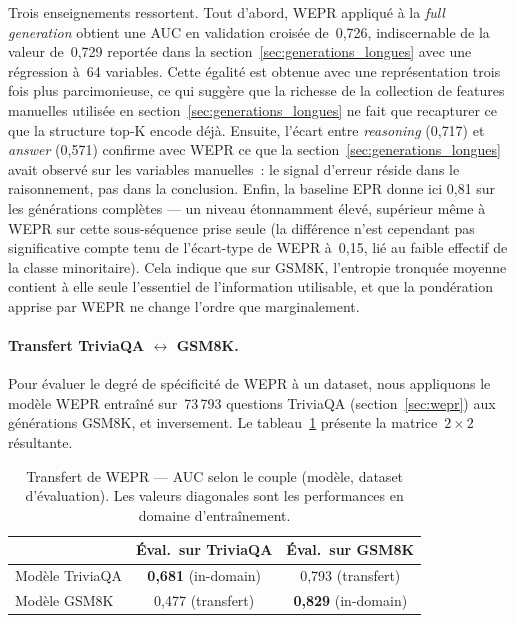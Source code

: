 Trois enseignements ressortent. Tout d'abord, WEPR appliqué à la
\emph{full generation} obtient une AUC en validation croisée de~0{,}726,
indiscernable de la valeur de~0{,}729 reportée dans la
section~\ref{sec:generations_longues} avec une régression à~64 variables. Cette
égalité est obtenue avec une représentation trois fois plus
parcimonieuse, ce qui suggère que la richesse de la collection de
features manuelles utilisée en section~\ref{sec:generations_longues}
ne fait que recapturer ce que la structure top-K encode déjà. Ensuite, l'écart entre
\emph{reasoning} (0{,}717) et \emph{answer} (0{,}571) confirme avec
WEPR ce que la section~\ref{sec:generations_longues} avait observé sur les variables
manuelles~: le signal d'erreur réside dans le raisonnement, pas dans la
conclusion. Enfin, la baseline EPR donne ici 0{,}81 sur les
générations complètes — un niveau étonnamment élevé, supérieur même à
WEPR sur cette sous-séquence prise seule (la différence n'est cependant
pas significative compte tenu de l'écart-type de WEPR à~0{,}15, lié au
faible effectif de la classe minoritaire). Cela indique que sur
GSM8K, l'entropie tronquée moyenne contient à elle seule l'essentiel de
l'information utilisable, et que la pondération apprise par WEPR ne
change l'ordre que marginalement.

\paragraph{Transfert TriviaQA $\leftrightarrow$ GSM8K.}
Pour évaluer le degré de spécificité de WEPR à un dataset, nous
appliquons le modèle WEPR entraîné sur~73\,793 questions TriviaQA
(section~\ref{sec:wepr}) aux générations GSM8K, et inversement. Le
tableau~\ref{tab:transfer_wepr} présente la matrice~$2 \times 2$
résultante.

\begin{table}[H]
\centering
\caption{Transfert de WEPR — AUC selon le couple
(modèle, dataset d'évaluation). Les valeurs diagonales sont les
performances en domaine d'entraînement.}
\label{tab:transfer_wepr}
\begin{tabular}{lcc}
\toprule
                              & \'Eval.\ sur TriviaQA & \'Eval.\ sur GSM8K \\
\midrule
Modèle TriviaQA               & \textbf{0{,}681} (in-domain) & 0{,}793 (transfert) \\
Modèle GSM8K                  & 0{,}477 (transfert)          & \textbf{0{,}829} (in-domain) \\
\bottomrule
\end{tabular}
\end{table}

